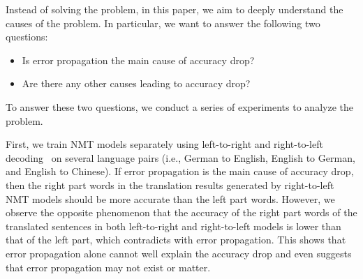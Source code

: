 \documentclass[11pt,a4paper]{article}
\begin{document}
Instead of solving the problem, in this paper, we aim to deeply understand the causes of the problem. In particular, we want to answer the following two questions:


\begin{itemize}
\item Is error propagation the main cause of accuracy drop?
\item Are there any other causes leading to accuracy drop?
\end{itemize}

To answer these two questions, we conduct a series of experiments to analyze the problem.

First, we train NMT models separately using left-to-right and right-to-left decoding~\cite{DBLP:conf/wmt/SennrichHB16,DBLP:conf/naacl/LiuUFS16,he2017decoding,gao2018efficient}  on several language pairs (i.e., German to English, English to German, and English to Chinese). If error propagation is the main cause of accuracy drop, then the right part words in the translation results generated by right-to-left NMT models should be more accurate than the left part words. However, we observe the opposite phenomenon that the accuracy of the right part words of the translated sentences in both left-to-right and right-to-left models is lower than that of the left part, which contradicts with error propagation. This shows that error propagation alone cannot well explain the accuracy drop and even suggests that error propagation may not exist or matter.
\end{document}
